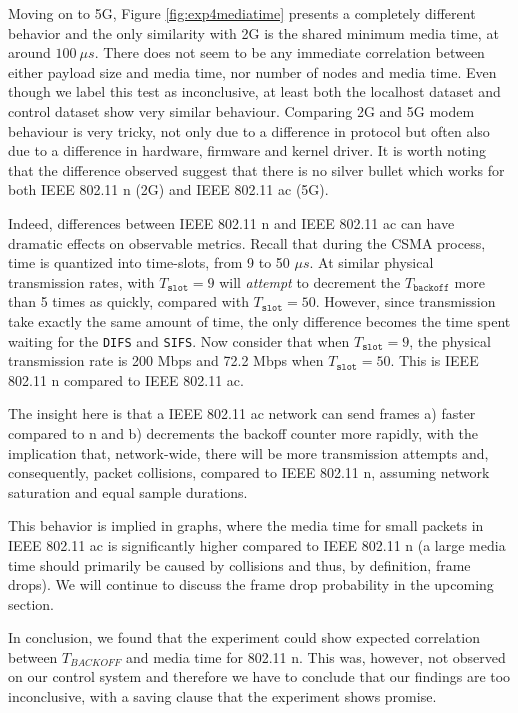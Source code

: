 Moving on to 5G, Figure \ref{fig:exp4mediatime} presents a completely different
behavior and the only similarity with 2G is the shared minimum media time, at around $100~\mu s$. There does not seem to be any immediate correlation between either payload size and media time, nor number of nodes and media time. Even though
we label this test as inconclusive, at least both the localhost dataset and control dataset show very similar behaviour. Comparing 2G and 5G modem behaviour is very tricky, not only due to a difference in protocol but often also due
to a difference in hardware, firmware and kernel driver. It is worth noting that
the difference observed suggest that there is no silver bullet which works for
both IEEE 802.11 n (2G) and IEEE 802.11 ac (5G).

Indeed, differences between IEEE 802.11 n and IEEE 802.11 ac can have dramatic effects
on observable metrics. Recall that during the CSMA process, time is quantized into time-slots, from 9
to 50 $\mu s$. At similar physical transmission rates, with $T_{\texttt{slot}}
= 9$ will \emph{attempt} to decrement the $T_{\texttt{backoff}}$ more than 5
times as quickly, compared with $T_\texttt{slot} = 50$. However, since
transmission take exactly the same amount of time, the only difference becomes
the time spent waiting for the \texttt{DIFS} and \texttt{SIFS}. Now consider
that when $T_{\texttt{slot}} = 9$, the physical transmission rate is 200 Mbps
and 72.2 Mbps when $T_{\texttt{slot}} = 50$. This is IEEE 802.11 n compared to
IEEE 802.11 ac.

The insight here is that a IEEE 802.11 ac network can send
frames a) faster compared to n and b) decrements the backoff counter more
rapidly, with the implication that, network-wide, there will be more
transmission attempts and, consequently, packet collisions, compared to
IEEE 802.11 n, assuming network saturation and equal sample durations.

This behavior is implied in graphs, where the media time for small packets in IEEE 802.11 ac is significantly higher compared to IEEE 802.11 n (a large media time should primarily be caused by collisions and thus, by definition, frame drops). We will continue to discuss the frame drop probability in the upcoming section.

In conclusion, we found that the experiment could show expected correlation between $T_{BACKOFF}$ and media time for 802.11 n. This was, however, not
observed on our control system and therefore we have to conclude that our findings are too inconclusive, with a saving clause that the experiment shows promise.

